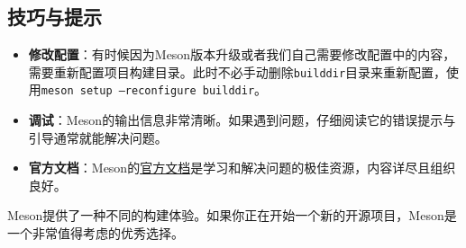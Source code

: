 \documentclass[../main.tex]{subfiles}
\begin{document}
\subsection{技巧与提示}
\begin{itemize}
    \item \textbf{修改配置}：有时候因为Meson版本升级或者我们自己需要修改配置中的内容，需要重新配置项目构建目录。此时不必手动删除\texttt{builddir}目录来重新配置，使用\texttt{meson setup --reconfigure builddir}。
    \item \textbf{调试}：Meson的输出信息非常清晰。如果遇到问题，仔细阅读它的错误提示与引导通常就能解决问题。
    \item \textbf{官方文档}：Meson的\href{https://mesonbuild.com/}{官方文档}是学习和解决问题的极佳资源，内容详尽且组织良好。
\end{itemize}

Meson提供了一种不同的构建体验。如果你正在开始一个新的开源项目，Meson是一个非常值得考虑的优秀选择。
\end{document}
